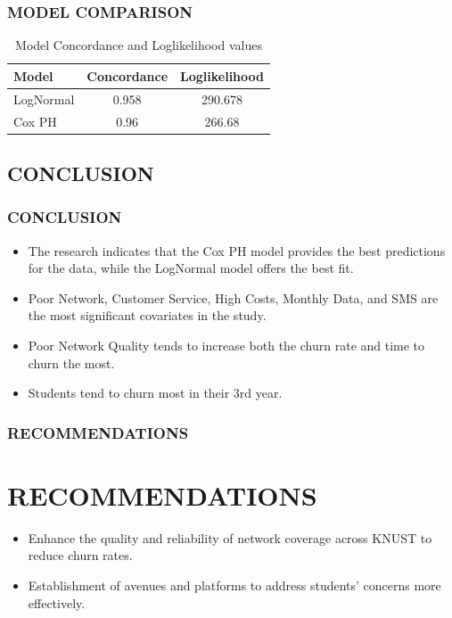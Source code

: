 \documentclass[12pt]{beamer}
\begin{document}
	\begin{frame}
		\frametitle{MODEL COMPARISON}
		\begin{table}[H]
			\centering
			\begin{tabular}{lcc}
				\toprule
				\textbf{Model} & \textbf{Concordance} & \textbf{Loglikelihood}\\
				\midrule
				LogNormal& 0.958& 	290.678 \\
				Cox PH & 0.96& 	266.68\\
				\bottomrule
			\end{tabular}
			\caption{Model Concordance and Loglikelihood values}
			\label{Table 2}
			
		\end{table}
		
	\end{frame}
	
	
	\begin{frame}
 	\section{CONCLUSION}

		\frametitle{CONCLUSION}
		\begin{itemize}
			\item The research indicates that the Cox PH model provides the best predictions for the data, while the LogNormal model offers the best fit. 
            \vspace{0.3cm}

           \item Poor Network, Customer Service, High Costs, Monthly Data, and SMS are the most significant covariates in the study.
           \vspace{0.3cm}
           
			\item Poor Network Quality tends to increase both the churn rate and time to churn the most.
            \vspace{0.3cm}
			\item Students tend to churn most in their 3rd year.
		\end{itemize}
	\end{frame}
 
	
	\begin{frame}
		\frametitle{RECOMMENDATIONS}
  \section{RECOMMENDATIONS}
		\begin{itemize}


			\item Enhance the quality and reliability of network coverage across KNUST to reduce churn rates.
\vspace{0.3cm}

			\item Establishment of avenues and platforms to address students' concerns more effectively.
    
    \end{itemize}	
 \end{frame}
	
\end{document}

